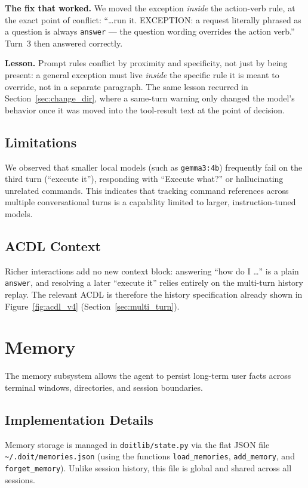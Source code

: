 \documentclass[11pt,a4paper]{article}
\begin{document}
\textbf{The fix that worked.} We moved the exception \emph{inside} the action-verb rule, at the exact point of conflict: ``\dots run it. EXCEPTION: a request literally phrased as a question is always \texttt{answer} --- the question wording overrides the action verb.'' Turn~3 then answered correctly.

\textbf{Lesson.} Prompt rules conflict by proximity and specificity, not just by being present: a general exception must live \emph{inside} the specific rule it is meant to override, not in a separate paragraph. The same lesson recurred in Section~\ref{sec:change_dir}, where a same-turn warning only changed the model's behavior once it was moved into the tool-result text at the point of decision.

\subsection{Limitations}
We observed that smaller local models (such as \texttt{gemma3:4b}) frequently fail on the third turn (``execute it''), responding with ``Execute what?'' or hallucinating unrelated commands. This indicates that tracking command references across multiple conversational turns is a capability limited to larger, instruction-tuned models.

\subsection{ACDL Context}
Richer interactions add no new context block: answering ``how do I \dots'' is a plain \texttt{answer}, and resolving a later ``execute it'' relies entirely on the multi-turn history replay. The relevant ACDL is therefore the history specification already shown in Figure~\ref{fig:acdl_v4} (Section~\ref{sec:multi_turn}).

\section{Memory}
\label{sec:memory}
The memory subsystem allows the agent to persist long-term user facts across terminal windows, directories, and session boundaries.

\subsection{Implementation Details}
Memory storage is managed in \texttt{doitlib/state.py} via the flat JSON file \texttt{\textasciitilde/.doit/memories.json} (using the functions \texttt{load\_memories}, \texttt{add\_memory}, and \texttt{forget\_memory}). Unlike session history, this file is global and shared across all sessions. 
\end{document}
